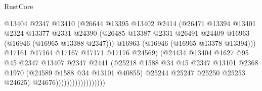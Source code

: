 \begin{lexlean}{RustCore}
\begin{coremodule}
                                      @13404
                                      @2347
                                      @13410
                                      (@26644
                                        @13395
                                        @13402
                                        @2414
                                        (@26471
                                          @13394
                                          @13401
                                          @2324
                                          @13377
                                          @2331
                                          @24390
                                          (@26485
                                            @13387
                                            @2331
                                            @26491
                                            @24409
                                            @16963
                                            (@16946 (@16965 @13388 @2347)))
                                          @16963
                                          (@16946 (@16965 @13378 @13394)))
                                        @17161
                                        @17164
                                        @17167
                                        @17171
                                        @17176
                                        @24569)
                                      (@24434
                                        @13404
                                        @1627
                                        @95
                                        @45
                                        @2347
                                        @13407
                                        @2347
                                        @2441
                                        (@25218
                                          @1588
                                          @34
                                          @45
                                          @2347
                                          @13101
                                          @2368
                                          @1970
                                          (@24589 @1588 @34 @13101 @40855)
                                          @25244
                                          @25247
                                          @25250
                                          @25253
                                          @24625)
                                        @24676))))))))))))))))))

\end{coremodule}
\end{lexlean}
